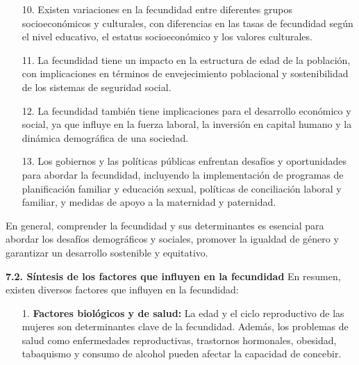 \documentclass[8pt,a4paper]{beamer}
\begin{document}
{\begin{frame}{}
\begin{block}{}
\setlength{\parskip}{3px}
\justifying
\begin{enumerate}
\setlength{\parskip}{3px}
\justifying
\item[10.] Existen variaciones en la fecundidad entre diferentes grupos socioeconómicos y culturales, con diferencias en las tasas de fecundidad según el nivel educativo, el estatus socioeconómico y los valores culturales.

\item[11.] La fecundidad tiene un impacto en la estructura de edad de la población, con implicaciones en términos de envejecimiento poblacional y sostenibilidad de los sistemas de seguridad social.

\item[12.] La fecundidad también tiene implicaciones para el desarrollo económico y social, ya que influye en la fuerza laboral, la inversión en capital humano y la dinámica demográfica de una sociedad.

\item[13.] Los gobiernos y las políticas públicas enfrentan desafíos y oportunidades para abordar la fecundidad, incluyendo la implementación de programas de planificación familiar y educación sexual, políticas de conciliación laboral y familiar, y medidas de apoyo a la maternidad y paternidad.

\end{enumerate}
En general, comprender la fecundidad y sus determinantes es esencial para abordar los desafíos demográficos y sociales, promover la igualdad de género y garantizar un desarrollo sostenible y equitativo.
\end{block}
\end{frame}


\begin{frame}{}
\begin{block}{\textbf{7.2. Síntesis de los factores que influyen en la fecundidad}}
\setlength{\parskip}{3px}
\justifying
En resumen, existen diversos factores que influyen en la fecundidad:
\begin{enumerate}
\setlength{\parskip}{3px}
\justifying
\item[1.] \textbf{Factores biológicos y de salud:} La edad y el ciclo reproductivo de las mujeres son determinantes clave de la fecundidad. Además, los problemas de salud como enfermedades reproductivas, trastornos hormonales, obesidad, tabaquismo y consumo de alcohol pueden afectar la capacidad de concebir.


\end{enumerate}
\end{block}
\end{frame}}
\end{document}
